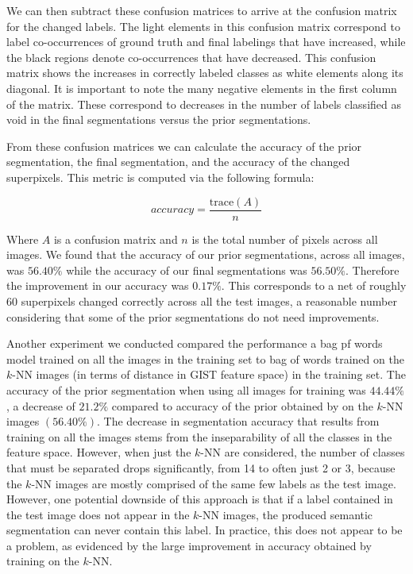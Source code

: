 \documentclass{article} %
\begin{document}
We can then subtract these confusion matrices to arrive at the confusion matrix for the changed labels. The light elements in this confusion matrix correspond to label co-occurrences of ground truth and final labelings that have increased, while the black regions denote co-occurrences that have decreased. This confusion matrix shows the increases in correctly labeled classes as white elements along its diagonal. It is important to note the many negative elements in the first column of the matrix. These correspond to decreases in the number of labels classified as void in the final segmentations versus the prior segmentations.

From these confusion matrices we can calculate the accuracy of the prior segmentation, the final segmentation, and the accuracy of the changed superpixels. This metric is computed via the following formula:

\begin{equation}
	accuracy = \frac{\mathrm{trace}(A)}{n}
\end{equation}

Where $A$ is a confusion matrix and $n$ is the total number of pixels across all images. We found that the accuracy of our prior segmentations, across all images, was $56.40\%$ while the accuracy of our final segmentations was $56.50\%$. Therefore the improvement in our accuracy was $0.17\%$. This corresponds to a net of roughly 60 superpixels changed correctly across all the test images, a reasonable number considering that some of the prior segmentations do not need improvements.

Another experiment we conducted compared the performance a bag pf words model trained on all the images in the training set to bag of words trained on the $k$-NN images (in terms of distance in GIST feature space) in the training set. The accuracy of the prior segmentation when using all images for training was $44.44\%$, a decrease of $21.2\%$ compared to accuracy of the prior obtained by on the $k$-NN images $(56.40\%)$. The decrease in segmentation accuracy that results from training on all the images stems from the inseparability of all the classes in the feature space. However, when just the $k$-NN are considered, the number of classes that must be separated drops significantly, from 14 to often just 2 or 3, because the $k$-NN images are mostly comprised of the same few labels as the test image. However, one potential downside of this approach is that if a label contained in the test image does not appear in the $k$-NN images, the produced semantic segmentation can never contain this label. In practice, this does not appear to be a problem, as evidenced by the large improvement in accuracy obtained by training on the $k$-NN.
\end{document}
